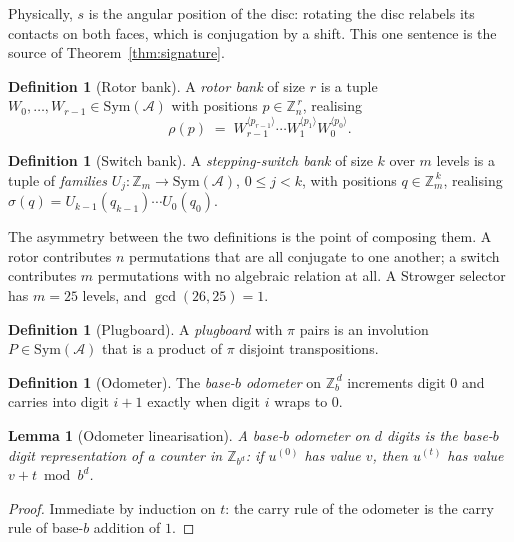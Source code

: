 \documentclass[11pt]{article}
\newtheorem{lemma}[theorem]{Lemma}
\theoremstyle{definition}
\newtheorem{definition}[theorem]{Definition}
\newcommand{\Sym}{\mathrm{Sym}}
\newcommand{\ZZ}{\mathbb{Z}}
\begin{document}
Physically, $s$ is the angular position of the disc: rotating the disc relabels
its contacts on both faces, which is conjugation by a shift. This one sentence
is the source of Theorem~\ref{thm:signature}.

\begin{definition}[Rotor bank]
A \emph{rotor bank} of size $r$ is a tuple $W_0,\dots,W_{r-1} \in
\Sym(\mathcal{A})$ with positions $p \in \ZZ_n^{\,r}$, realising
\[
  \rho(p) \;=\; W_{r-1}^{\langle p_{r-1}\rangle}\cdots W_1^{\langle p_1\rangle}
  W_0^{\langle p_0\rangle}.
\]
\end{definition}

\begin{definition}[Switch bank]
A \emph{stepping-switch bank} of size $k$ over $m$ levels is a tuple of
\emph{families} $U_j : \ZZ_m \to \Sym(\mathcal{A})$, $0 \le j < k$, with
positions $q \in \ZZ_m^{\,k}$, realising
$\sigma(q) = U_{k-1}(q_{k-1})\cdots U_0(q_0)$.
\end{definition}

The asymmetry between the two definitions is the point of composing them. A
rotor contributes $n$ permutations that are all conjugate to one another; a
switch contributes $m$ permutations with no algebraic relation at all. A Strowger
selector has $m = 25$ levels, and $\gcd(26,25) = 1$.

\begin{definition}[Plugboard]
A \emph{plugboard} with $\pi$ pairs is an involution $P \in \Sym(\mathcal{A})$
that is a product of $\pi$ disjoint transpositions.
\end{definition}

\begin{definition}[Odometer]
The \emph{base-$b$ odometer} on $\ZZ_b^{\,d}$ increments digit $0$ and carries
into digit $i+1$ exactly when digit $i$ wraps to $0$.
\end{definition}

\begin{lemma}[Odometer linearisation]\label{lem:odo}
A base-$b$ odometer on $d$ digits is the base-$b$ digit representation of a
counter in $\ZZ_{b^d}$: if $u^{(0)}$ has value $v$, then $u^{(t)}$ has value
$v + t \bmod b^{d}$.
\end{lemma}

\begin{proof}
Immediate by induction on $t$: the carry rule of the odometer is the carry rule
of base-$b$ addition of $1$.
\end{proof}
\end{document}

